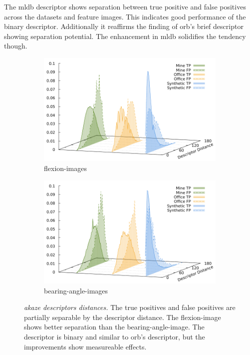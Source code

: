 The \acrshort{mldb} descriptor shows separation between true positive and false positives across the datasets and feature images.
This indicates good performance of the binary descriptor.
Additionally it reaffirms the finding of \acrshort{orb}'s \acrshort{brief} descriptor showing separation potential.
The enhancement in \acrshort{mldb} solidifies the tendency though.
\begin{figure}[htp]
\begin{subfigure}[t]{0.45\linewidth}
    \includegraphics[width=\linewidth]{chapter06/results/AKAZE/flexion/descriptor_distances.pdf}%
    \caption{\glspl{flexion-image}}
\end{subfigure}\quad
\begin{subfigure}[t]{0.45\linewidth}
    \includegraphics[width=\linewidth]{chapter06/results/AKAZE/bearing/descriptor_distances.pdf}%
    \caption{\glspl{bearing-angle-image}}
\end{subfigure}
    \caption[\acrshort{akaze} descriptors distances]{\emph{\acrshort{akaze} descriptors distances.} The true positives and false positives are partially separable by the descriptor distance. The \gls{flexion-image} shows better separation than the \gls{bearing-angle-image}. The descriptor is binary and similar to \acrshort{orb}'s descriptor, but the improvements show measureable effects.}
\end{figure}

